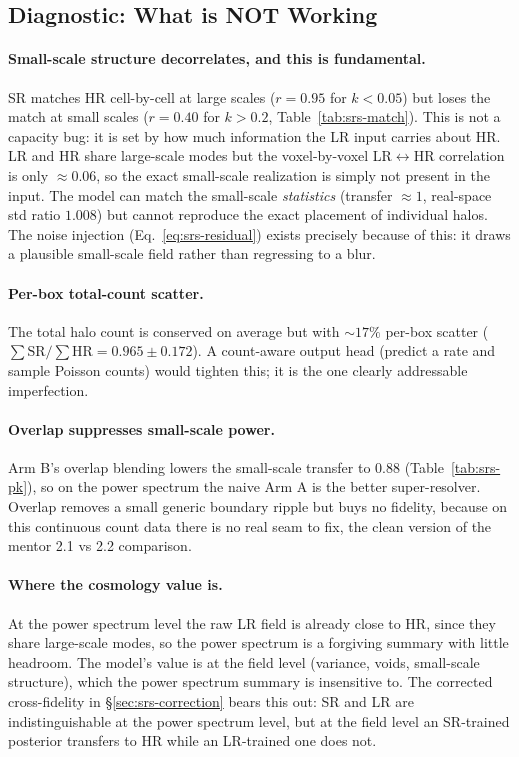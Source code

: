 \subsection{Diagnostic: What is NOT Working}

\paragraph{Small-scale structure decorrelates, and this is fundamental.} SR
matches HR cell-by-cell at large scales ($r{=}0.95$ for $k<0.05$) but loses the
match at small scales ($r{=}0.40$ for $k>0.2$, Table~\ref{tab:srs-match}). This
is not a capacity bug: it is set by how much information the LR input carries
about HR. LR and HR share large-scale modes but the voxel-by-voxel LR$\leftrightarrow$HR
correlation is only $\approx0.06$, so the exact small-scale realization is simply
not present in the input. The model can match the small-scale \emph{statistics}
(transfer $\approx1$, real-space std ratio $1.008$) but cannot reproduce the
exact placement of individual halos. The noise injection
(Eq.~\ref{eq:srs-residual}) exists precisely because of this: it draws a
plausible small-scale field rather than regressing to a blur.

\paragraph{Per-box total-count scatter.} The total halo count is conserved on
average but with $\sim17\%$ per-box scatter ($\sum\mathrm{SR}/\sum\mathrm{HR}=
0.965\pm0.172$). A count-aware output head (predict a rate and sample Poisson
counts) would tighten this; it is the one clearly addressable imperfection. 

\paragraph{Overlap suppresses small-scale power.} Arm B's overlap blending lowers
the small-scale transfer to $0.88$ (Table~\ref{tab:srs-pk}), so on the power
spectrum the naive Arm A is the better super-resolver. Overlap removes a small
generic boundary ripple but buys no fidelity, because on this continuous count
data there is no real seam to fix, the clean version of the mentor 2.1 vs 2.2
comparison.

\paragraph{Where the cosmology value is.} At the power spectrum level the raw LR
field is already close to HR, since they share large-scale modes, so the power
spectrum is a forgiving summary with little headroom. The model's value is at the
field level (variance, voids, small-scale structure), which the power spectrum
summary is insensitive to. The corrected cross-fidelity in
\S\ref{sec:srs-correction} bears this out: SR and LR are indistinguishable at the
power spectrum level, but at the field level an SR-trained posterior transfers to
HR while an LR-trained one does not.

